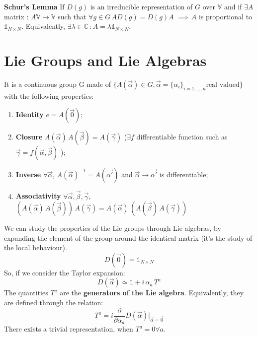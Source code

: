 \documentclass[../../main/main.tex]{subfiles}
\begin{document}
\textbf{Schur's Lemma} If $D(g)$ is an irreducible representation of $G$ over $\mathbb{V}$ and if $\exists A$ matrix : $A \mathbb{V} \to \mathbb{V}$ such that $\forall g \in G \, AD(g)=D(g)A$ $\implies \, A$ is proportional to $\mathbb{1}_{N \times N}$. Equivalently, $\exists \lambda \in \mathbb{C} \, : A = \lambda \mathbb{1}_{N \times N}$.

\chapter{Lie Groups and Lie Algebras}
\begin{definition}
It is a continuous group G made of $\{A(\vec{\alpha}) \in G, \vec{\alpha}=\{\alpha_i \}_{i=1,...,n} \text{real valued}\}$ with the following properties:
\begin{enumerate}
\item \textbf{Identity} $e = A(\vec{0})$;
\item \textbf{Closure} $A(\vec{\alpha})\, A(\vec{\beta})= A(\vec{\gamma})$ ($\exists f$ differentiable function such as $\vec{\gamma}=f(\vec{\alpha}, \vec{\beta})$ );
\item \textbf{Inverse} $\forall \vec{\alpha}$, $A(\vec{\alpha})^{-1}=A(\vec{\alpha '})$ and $\vec{\alpha} \to \vec{\alpha ' }$ is differentiable;
\item \textbf{Associativity} $\forall \vec{\alpha}, \vec{\beta}, \vec{\gamma}$, $(A(\vec{\alpha}) \, A(\vec{\beta})) \,  A(\vec{\gamma}) = A(\vec{\alpha}) \, ( A(\vec{\beta})\,A(\vec{\gamma}) )  $
\end{enumerate}
\end{definition}
We can study the properties of the Lie groups through Lie algebras, by expanding the element of the group around the identical matrix (it's the study of the local behaviour).
\begin{equation*}
D(\vec{0}) = \mathbb{1}_{N \times N}
\end{equation*}
So, if we consider the Taylor expansion:
\begin{equation*}
D(\vec{\alpha}) \simeq \mathbb{1} + i \, \alpha_a \,  T^a
\end{equation*}
The quantities $T^a$ are the \textbf{generators of the Lie algebra}. Equivalently, they are defined through the relation:
\begin{equation*}
T^{a}= i \frac{\partial}{\partial \alpha_a} D(\vec{\alpha}) \Big|_{\vec{\alpha}=\vec{0}}
\end{equation*}
There exists a trivial representation, when $T^a=0 \forall a$. \newline
\end{document}
